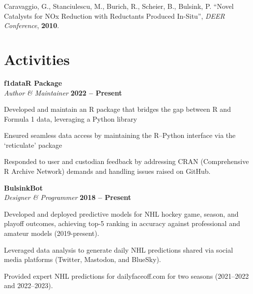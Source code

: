 \documentclass[margin,line]{resumecls}
\begin{document}
\begin{resume}
	\vspace{0mm}
    Caravaggio, G., Stanciulescu, M., Burich, R., Scheier, B., Bulsink, P. ``Novel Catalysts for NOx Reduction with Reductants Produced In-Situ'', \textit{DEER Conference}, \textbf{2010}.
\vspace{1mm}

    \newpage
    \section{\mysidestyle Activities}

    \textbf{f1dataR Package}\\\vspace{1mm}%
    \textsl{Author \& Maintainer} \hfill \textbf{2022 -- Present}\\\vspace{-5mm}%
    \begin{list2}
        \item Developed and maintain an R package that bridges the gap between R and Formula 1 data, leveraging a Python library
        \item Ensured seamless data access by maintaining the R--Python interface via the `reticulate' package
        \item Responded to user and custodian feedback by addressing CRAN (Comprehensive R Archive Network) demands and handling issues raised on GitHub.
    \end{list2}

    \textbf{BulsinkBot}\\\vspace{1mm}%
    \textsl{Designer \& Programmer} \hfill \textbf{2018 -- Present}\\\vspace{-5mm}%
    \begin{list2}
        \item Developed and deployed predictive models for NHL hockey game, season, and playoff outcomes, achieving top-5 ranking in accuracy against professional and amateur models (2019-present).
        \item Leveraged data analysis to generate daily NHL predictions shared via social media platforms (Twitter, Mastodon, and BlueSky).
        \item Provided expert NHL predictions for dailyfaceoff.com for two seasons (2021--2022 and 2022--2023).
    \end{list2}


\end{resume}
\end{document}
